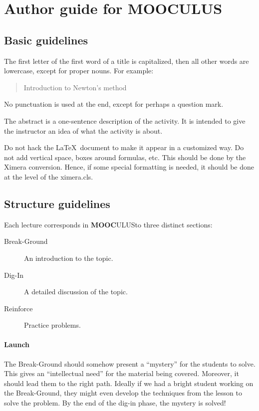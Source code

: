 \documentclass{article}
\newcommand{\mooculus}{\textsf{\textbf{MOOC}\textnormal{\textsf{ULUS}}}}
\begin{document}
\section*{Author guide for \mooculus}

\subsection*{Basic guidelines}

The first letter of the first word of a title is capitalized, then all
other words are lowercase, except for proper nouns. For example:
\begin{quote}
Introduction to Newton's method
\end{quote}
No punctuation is used at the end, except for perhaps a question mark.


The abstract is a one-sentence description of the activity. It is
intended to give the instructor an idea of what the activity is about.


Do not hack the \LaTeX\ document to make it appear in a customized
way. Do not add vertical space, boxes around formulas, etc. This
should be done by the Ximera conversion. Hence, if some special
formatting is needed, it should be done at the level of the
ximera.cls.

\subsection*{Structure guidelines}

Each lecture corresponds in \mooculus to three distinct sections:
\begin{description}
\item[Break-Ground] An introduction to the topic.
\item[Dig-In] A detailed discussion of the topic.
\item[Reinforce] Practice problems.
\end{description}

\paragraph{Launch}

The Break-Ground should somehow present a ``mystery'' for the students
to solve.  This gives an ``intellectual need'' for the material being
covered. Moreover, it should lead them to the right path. Ideally if
we had a bright student working on the Break-Ground, they might even develop
the techniques from the lesson to solve the problem.  By the end of
the dig-in phase, the mystery is solved!
\end{document}
